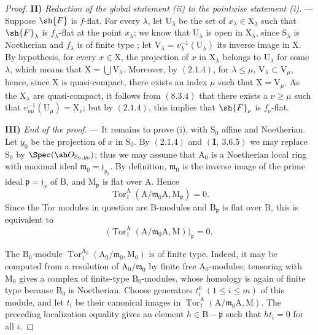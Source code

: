\begin{proof}
\medskip
\noindent\textbf{II)} \emph{Reduction of the global statement (ii) to the pointwise statement (i).} --- Suppose $\sh{F}$ is $f$-flat. For every $\lambda$, let $\mathrm{U}_\lambda$ be the set of $x_\lambda\in\mathrm{X}_\lambda$ such that $\sh{F}_\lambda$ is $f_\lambda$-flat at the point $x_\lambda$; we know that $\mathrm{U}_\lambda$ is open in $\mathrm{X}_\lambda$, since $\mathrm{S}_\lambda$ is Noetherian and $f_\lambda$ is of finite type ; let $\mathrm{V}_\lambda=v_\lambda^{-1}(\mathrm{U}_\lambda)$ its inverse image in $\mathrm{X}$. By hypothesis, for every $x\in\mathrm{X}$, the projection of $x$ in $\mathrm{X}_\lambda$ belongs to $\mathrm{U}_\lambda$ for some $\lambda$, which means that $\mathrm{X}=\bigcup\mathrm{V}_\lambda$. Moreover, by $(2.1.4)$, for $\lambda\leqslant\mu$, $\mathrm{V}_\lambda\subset\mathrm{V}_\mu$, hence, since $\mathrm{X}$ is quasi-compact, there exists an index $\mu$ such that $\mathrm{X}=\mathrm{V}_\mu$. As the $\mathrm{X}_\lambda$ are quasi-compact, it follows from $(8.3.4)$ that there exists a $\nu\geqslant\mu$ such that $v_{\nu\mu}^{-1}(\mathrm{U}_\mu)=\mathrm{X}_\nu$; but by $(2.1.4)$, this implies that $\sh{F}_\nu$ is $f_\nu$-flat.

\medskip
\noindent\textbf{III)} \emph{End of the proof.} --- It remains to prove
(i), with $\mathrm S_0$ affine and Noetherian. Let $y_0$ be the
projection of $x$ in $\mathrm S_0$. By $(2.1.4)$ and
$(\mathbf I,~3.6.5)$ we may replace $\mathrm S_0$ by
$\Spec(\sh O_{\mathrm S_0,y_0})$; thus we may assume that
$\mathrm A_0$ is a Noetherian local ring with maximal ideal
$\mathfrak m_0=\mathfrak j_{y_0}$. By definition,
$\mathfrak m_0$ is the inverse image of the prime ideal
$\mathfrak p=\mathfrak j_x$ of $\mathrm B$, and
$\mathrm M_{\mathfrak p}$ is flat over $\mathrm A$. Hence
\[
  \operatorname{Tor}_1^\mathrm A
  (\mathrm A/\mathfrak m_0\mathrm A,\mathrm M_{\mathfrak p})=0.
\]
Since the Tor modules in question are $\mathrm B$-modules and
$\mathrm B_{\mathfrak p}$ is flat over $\mathrm B$, this is equivalent
to
\[
  \bigl(\operatorname{Tor}_1^\mathrm A
  (\mathrm A/\mathfrak m_0\mathrm A,\mathrm M)\bigr)_{\mathfrak p}=0.
\]

The $\mathrm B_0$-module
$\operatorname{Tor}_1^{\mathrm A_0}
(\mathrm A_0/\mathfrak m_0,\mathrm M_0)$ is of finite type. Indeed, it
may be computed from a resolution of $\mathrm A_0/\mathfrak m_0$ by
finite free $\mathrm A_0$-modules; tensoring with $\mathrm M_0$ gives a
complex of finite-type $\mathrm B_0$-modules, whose homology is again
of finite type because $\mathrm B_0$ is Noetherian. Choose generators
$t_i^0$ $(1\leqslant i\leqslant m)$ of this module, and let $t_i$ be
their canonical images in
$\operatorname{Tor}_1^\mathrm A
(\mathrm A/\mathfrak m_0\mathrm A,\mathrm M)$. The preceding
localization equality gives an element
$h\in\mathrm B-\mathfrak p$ such that $ht_i=0$ for all $i$.


\end{proof}
